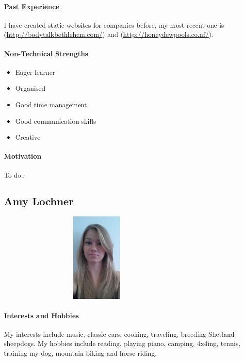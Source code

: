 \documentclass[english]{article}
\begin{document}
			\paragraph{Past Experience}
            I have created static websites for companies before, my most recent one is (\href{http://bodytalkbethlehem.com/}{http://bodytalkbethlehem.com/}) and (\href{http://honeydewpools.co.nf/}{http://honeydewpools.co.nf/}).
			
			\paragraph{Non-Technical Strengths}
			\begin{itemize}
				\setlength\itemsep{0.2em}
			        \item Eager learner
			        \item Organised 
			        \item Good time management
			        \item Good communication skills
			        \item Creative
			\end{itemize}
			
			\paragraph{Motivation}
			To do..
		
		\newpage
		\subsection{Amy Lochner}
		    \begin{figure}
				\begin{center}
					\includegraphics[width=8cm, height=4.5cm, angle=90]{amy.jpg}
				\end{center}
			\end{figure}
			\paragraph{Interests and Hobbies}
			My interests include music, classic cars, cooking, traveling, breeding Shetland sheepdogs. My hobbies include reading, playing piano, camping, 4x4ing, tennis, training my dog, mountain biking and horse riding.
			
\end{document}
